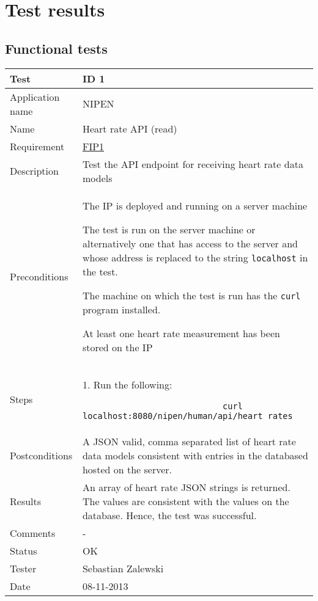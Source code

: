 \chapter{Test results}
\label{AppendixG}

\section{Functional tests}

\begin{table}
\begin{center}
\begin{tabular}{ | l | p{10cm} | }
	\hline
	\textbf{Test}	&	\textbf{ID 1} \\
	\hline\noalign{\smallskip}\noalign{\smallskip}\hline
	Application name	& NIPEN \\
	Name				& Heart rate API (read) \\
	Requirement			& \hyperref[table:reqip]{FIP1} \\
	Description			& Test the API endpoint for receiving heart rate data models \\
	Preconditions		& 	\par The IP is deployed and running on a server machine 
							\par The test is run on the server machine or alternatively
							one that has access to the server and whose address is replaced to the
							string \verb|localhost| in the test.
							\par The machine on which the test is run has the \verb|curl| program installed.
							\par At least one heart rate measurement has been stored on the IP \\
	Steps 				&	1. Run the following:
							\begin{verbatim}
							curl localhost:8080/nipen/human/api/heart_rates
							\end{verbatim}
							\\
	Postconditions		& A JSON valid, comma separated list of heart rate data models consistent with 
							entries in the databased hosted on the server. \\
	Results				& An array of heart rate JSON strings is returned. 
						  The values are consistent with the values on the database. 
						  Hence, the test was successful. \\
	Comments			& - \\
	Status				& OK \\
	Tester				& Sebastian Zalewski \\
	Date				& 08-11-2013 \\
	\hline
\end{tabular}
\end{center}
\end{table}

